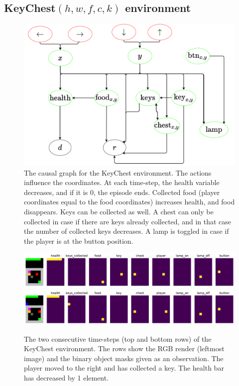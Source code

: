 \documentclass[a4paper,11pt,oneside]{report}
\begin{document}
\subsection{KeyChest$(h,w,f,c,k)$ environment}
\begin{figure}
    \centering
    \includegraphics[width=0.7\linewidth]{diagrams/env_true_kc}
    \caption{The causal graph for the KeyChest environment. The actions influence the coordinates. At each time-step, the health variable decreases, and if it is $0$, the episode ends. Collected food (player coordinates equal to the food coordinates) increases health, and food disappears. Keys can be collected as well. A chest can only be collected in case if there are keys already collected, and in that case the number of collected keys decreases. A lamp is toggled in case if the player is at the button position.}
    \label{fig:envtruekc}
\end{figure}

\begin{figure}
    \centering
    \includegraphics[width=0.95\linewidth]{plots/keychest_5x5_1f1c1k_pre}\\
    \includegraphics[width=0.95\linewidth]{plots/keychest_5x5_1f1c1k_post}
    \caption{The two consecutive time-steps (top and bottom rows) of the KeyChest environment. The rows show the RGB render (leftmost image) and the binary object masks given as an observation. The player moved to the right and has collected a key. The health bar has decreased by 1 element.}
    \label{fig:keychest5x51f1c1k}
\end{figure}
\end{document}
